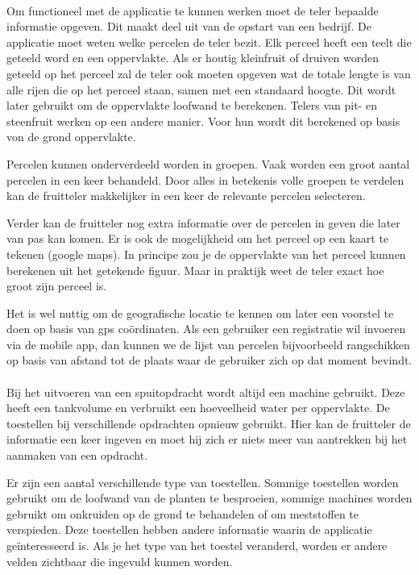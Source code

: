 \paragraph {} Om functioneel met de applicatie te kunnen werken moet de teler bepaalde
informatie opgeven. Dit maakt deel uit van de opstart van een bedrijf.
De applicatie moet weten welke percelen de teler bezit.
Elk perceel heeft een teelt die geteeld word en een oppervlakte. Als er houtig
kleinfruit of druiven worden geteeld op het perceel zal de teler ook moeten opgeven wat de
totale lengte is van alle rijen die op het perceel staan, samen met een standaard hoogte.
Dit wordt later gebruikt om de oppervlakte loofwand te berekenen. Telers van pit- en
steenfruit werken op een andere manier. Voor hun wordt dit berekened op basis von de
grond oppervlakte.

Percelen kunnen onderverdeeld worden in groepen. Vaak worden een groot aantal percelen in
een keer behandeld. Door alles in betekenis volle groepen te verdelen kan de fruitteler
makkelijker in een keer de relevante percelen selecteren.

Verder kan de fruitteler nog extra informatie over de percelen in geven die later van pas
kan komen. Er is ook de mogelijkheid om het perceel op een kaart te tekenen (google maps).
In principe zou je de oppervlakte van het perceel kunnen berekenen uit het getekende
figuur. Maar in praktijk weet de teler exact hoe groot zijn perceel is.

Het is wel nuttig om de geografische locatie te kennen om later een voorstel te doen op
basis van gps co\"ordinaten. Als een gebruiker een registratie wil invoeren via de mobile
app, dan kunnen we de lijst van percelen bijvoorbeeld rangschikken op basis van afstand
tot de plaats waar de gebruiker zich op dat moment bevindt.

\paragraph {} Bij het uitvoeren van een spuitopdracht wordt altijd een machine gebruikt.
Deze heeft een tankvolume en verbruikt een hoeveelheid water per oppervlakte. De
toestellen bij verschillende opdrachten opnieuw gebruikt. Hier kan de fruitteler de
informatie een keer ingeven en moet hij zich er niets meer van aantrekken bij het aanmaken
van een opdracht.

Er zijn een aantal verschillende type van toestellen. Sommige toestellen worden gebruikt
om de loofwand van de planten te besproeien, sommige machines worden gebruikt om onkruiden
op de grond te behandelen of om meststoffen te verspieden. Deze toestellen hebben andere
informatie waarin de applicatie ge\"interesseerd is. Als je het type van het toestel
veranderd, worden er andere velden zichtbaar die ingevuld kunnen worden.

